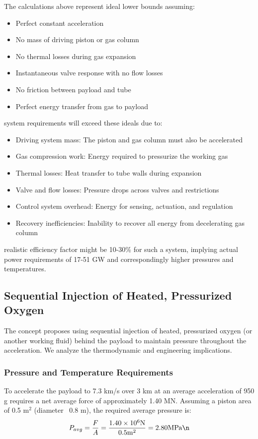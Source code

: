 \documentclass{article}
\begin{document}
The calculations above represent ideal lower bounds assuming:\n\begin{itemize}
    \item Perfect constant acceleration\n    \item No mass of driving piston or gas column\n    \item No thermal losses during gas expansion\n    \item Instantaneous valve response with no flow losses\n    \item No friction between payload and tube\n    \item Perfect energy transfer from gas to payload\n\end{itemize}
\nReal system requirements will exceed these ideals due to:\n\begin{itemize}
    \item Driving system mass: The piston and gas column must also be accelerated\n    \item Gas compression work: Energy required to pressurize the working gas\n    \item Thermal losses: Heat transfer to tube walls during expansion\n    \item Valve and flow losses: Pressure drops across valves and restrictions\n    \item Control system overhead: Energy for sensing, actuation, and regulation\n    \item Recovery inefficiencies: Inability to recover all energy from decelerating gas column\n\end{itemize}
\nA realistic efficiency factor might be 10-30\% for such a system, implying actual power requirements of 17-51 GW and correspondingly higher pressures and temperatures.\n\n\subsection{Sequential Injection of Heated, Pressurized Oxygen}
The concept proposes using sequential injection of heated, pressurized oxygen (or another working fluid) behind the payload to maintain pressure throughout the acceleration. We analyze the thermodynamic and engineering implications.\n\n\subsubsection{Pressure and Temperature Requirements}
To accelerate the payload to 7.3 km/s over 3 km at an average acceleration of 950 g requires a net average force of approximately 1.40 MN. Assuming a piston area of 0.5 m$^2$ (diameter ~0.8 m), the required average pressure is:\n\begin{equation}
 P_{avg} = \frac{F}{A} = \frac{1.40 \times 10^6  \text{N}}{0.5  \text{m}^2} = 2.80  \text{MPa}\n\end{equation}
\end{document}
